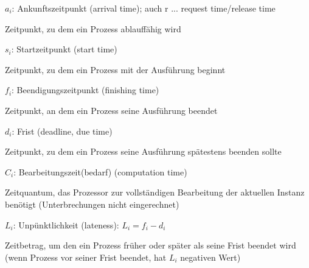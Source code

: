 \documentclass[a4paper]{article}
\begin{document}
\begin{multicols}{3}
    \begin{itemize*}
        \item
        $a_i$: Ankunftszeitpunkt (arrival time); auch r ... request
        time/release time
        \begin{itemize*}
            \item Zeitpunkt, zu dem ein Prozess ablauffähig wird
        \end{itemize*}
        \item
        $s_i$: Startzeitpunkt (start time)
        \begin{itemize*}
            \item Zeitpunkt, zu dem ein Prozess mit der Ausführung beginnt
        \end{itemize*}
        \item
        $f_i$: Beendigungszeitpunkt (finishing time)
        \begin{itemize*}
            \item Zeitpunkt, an dem ein Prozess seine Ausführung beendet
        \end{itemize*}
        \item
        $d_i$: Frist (deadline, due time)
        \begin{itemize*}
            \item Zeitpunkt, zu dem ein Prozess seine Ausführung spätestens beenden sollte
        \end{itemize*}
        \item
        $C_i$: Bearbeitungszeit(bedarf) (computation time)
        \begin{itemize*}
            \item Zeitquantum, das Prozessor zur vollständigen Bearbeitung der aktuellen Instanz benötigt (Unterbrechungen nicht eingerechnet)
        \end{itemize*}
        \item
        $L_i$: Unpünktlichkeit (lateness): $L_i= f_i - d_i$
        \begin{itemize*}
            \item Zeitbetrag, um den ein Prozess früher oder später als seine Frist beendet wird (wenn Prozess vor seiner Frist beendet, hat $L_i$ negativen Wert)
        \end{itemize*}

\end{itemize*}
\end{multicols}
\end{document}
